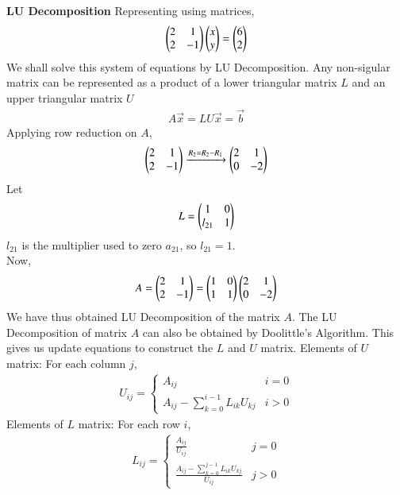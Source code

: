 \documentclass[journal]{IEEEtran}
\begin{document}
\textbf{LU Decomposition}\newline
Representing using matrices,
\begin{align}
    \begin{pmatrix}
        2 & 1\\
        2 & -1
    \end{pmatrix} \begin{pmatrix}x \\ y\end{pmatrix}= \begin{pmatrix} 6 \\ 2\end{pmatrix}
\end{align}
We shall solve this system of equations by LU Decomposition. Any non-sigular matrix can be represented as a product of a lower triangular matrix $L$ and an upper triangular matrix $U$
\begin{align}
    A\vec{x} = LU\vec{x} = \vec{b}
\end{align}
Applying row reduction on $A$,
\begin{align}
  \begin{pmatrix}2 & 1\\ 2 & -1\end{pmatrix} \xrightarrow{R_2 = R_2 - R_1} \begin{pmatrix}2 & 1 \\ 0 & -2\end{pmatrix}
\end{align}
Let 
\begin{align}
    L = \begin{pmatrix}1 & 0\\ l_{21} & 1\end{pmatrix}
\end{align}
$l_{21}$ is the multiplier used to zero $a_{21}$, so $l_{21} = 1$.\\
\newline
Now,
\begin{align}
    A = \begin{pmatrix}2 & 1 \\ 2 & -1\end{pmatrix} = \begin{pmatrix}1 & 0 \\ 1 & 1\end{pmatrix}\begin{pmatrix}2 & 1 \\ 0 & -2\end{pmatrix}
\end{align}
We have thus obtained LU Decomposition of the matrix $A$.\newline
The LU Decomposition of matrix $A$ can also be obtained by Doolittle's Algorithm. This gives us update equations to construct the $L$ and $U$ matrix. \newline
Elements of $U$ matrix:\newline
For each column $j$,
\begin{align}
  U_{ij} = \begin{cases}
    A_{ij} & i=0 \\
    A_{ij} - \sum _{k=0}^{i-1} L_{ik}U_{kj} & i>0
  \end{cases}
\end{align}
Elements of $L$ matrix:\newline
For each row $i$,
\begin{align}
  L_{ij} = \begin{cases}
    \frac{A_{ij}}{U_{ij}} & j=0 \\
    \frac{A_{ij} - \sum _{k=0}^{j-1} L_{ik}U_{kj}}{U_{ij}} & j>0
  \end{cases}
\end{align}
\end{document}
